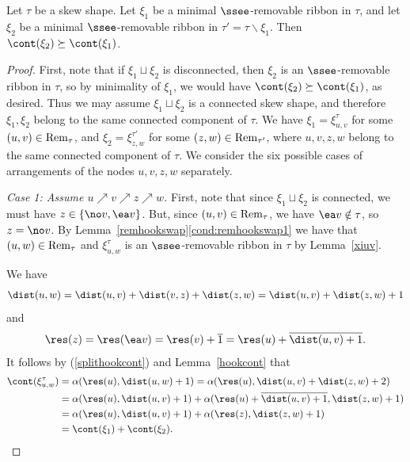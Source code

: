  \begin{lemma}\label{remsinorder}
Let \(\tau\) be a skew shape. Let \(\xi_1\) be a minimal \(\ssee\)-removable ribbon in \(\tau\), and let \(\xi_2\) be a minimal \(\ssee\)-removable ribbon in \(\tau'=\tau\backslash \xi_1\). Then \(\cont(\xi_2) \succeq \cont(\xi_1)\).
 \end{lemma}
 \begin{proof}
First, note that if \(\xi_1 \sqcup \xi_2\) is disconnected, then \(\xi_2\) is an \(\ssee\)-removable ribbon in \(\tau\), so by minimality of \(\xi_1\), we would have \(\cont(\xi_2) \succeq \cont(\xi_1)\), as desired. Thus we may assume \(\xi_1 \sqcup \xi_2\) is a connected skew shape, and therefore \(\xi_1, \xi_2\) belong to the same connected component of \(\tau\). 
  We have \(\xi_1 = \xi^\tau_{u,v}\) for some \((u,v) \in \textup{Rem}_\tau\), and \(\xi_2 = \xi^{\tau'}_{z,w}\) for some \((z,w) \in \textup{Rem}_{\tau'}\), where \(u,v,z,w\) belong to the same connected component of \(\tau\).  
We consider the six possible cases of arrangements of the nodes \(u,v,z,w\) separately.
 
 {\em Case 1: Assume \(u \nearrow v \nearrow z \nearrow w\).} First, note that since \(\xi_1 \sqcup \xi_2\) is connected, we must have \(z \in \{\no v, \ea v\}\). But, since \((u,v) \in \textup{Rem}_\tau\), we have \(\ea v \notin \tau\), so \(z=\no v\). 
By Lemma~\ref{remhookswap}\eqref{cond:remhookswap1} we have that \((u,w) \in \textup{Rem}_\tau\) and \(\xi^\tau_{u,w}\) is an \(\ssee\)-removable ribbon in \(\tau\) by Lemma~\ref{xiuv}.
 
We have
\begin{align*}
\dist(u,w) = 
\dist(u,v) + \dist(v,z) + \dist(z,w) = 
 \dist(u,v) + \dist(z,w) + 1
\end{align*}
and
\begin{align*}
\res(z) = \res(\ea v) = \res(v) + \overline{1} = \res(u) + \overline{\dist(u,v) + 1}.
\end{align*}
It follows by (\ref{splithookcont}) and Lemma~\ref{hookcont} that 
\begin{align*}
\cont(\xi^\tau_{u,w}) &= \alpha(\res(u), \dist(u,w)+1) = \alpha(\res(u),  \dist(u,v) + \dist(z,w) + 2)\\
&= \alpha(\res(u), \dist(u,v)+1) + \alpha(\res(u) + \overline{\dist(u,v)+1}, \dist(z,w)+1)\\
&= \alpha(\res(u),  \dist(u,v)+1) + \alpha(\res(z), \dist(z,w)+1)\\
&= \cont(\xi_1) + \cont(\xi_2).
\end{align*}


\end{proof}
